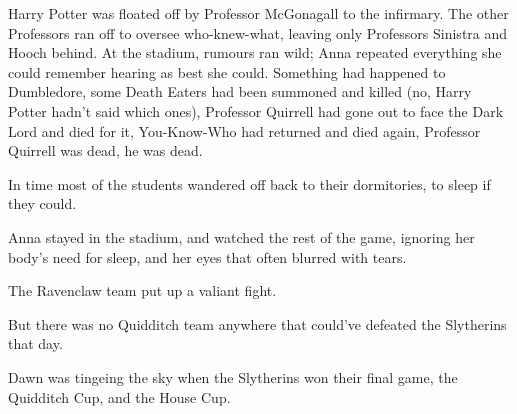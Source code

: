 Harry Potter was floated off by Professor McGonagall to the infirmary. The other Professors ran off to oversee who-knew-what, leaving only Professors Sinistra and Hooch behind. At the stadium, rumours ran wild; Anna repeated everything she could remember hearing as best she could. Something had happened to Dumbledore, some Death Eaters had been summoned and killed (no, Harry Potter hadn't said which ones), Professor Quirrell had gone out to face the Dark Lord and died for it, You-Know-Who had returned and died again, Professor Quirrell was dead, he was dead.

In time most of the students wandered off back to their dormitories, to sleep if they could.

Anna stayed in the stadium, and watched the rest of the game, ignoring her body's need for sleep, and her eyes that often blurred with tears.

The Ravenclaw team put up a valiant fight.

But there was no Quidditch team anywhere that could've defeated the Slytherins that day.

Dawn was tingeing the sky when the Slytherins won their final game, the Quidditch Cup, and the House Cup.

